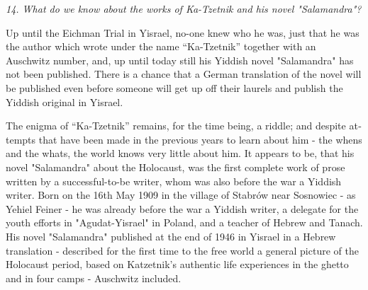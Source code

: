 \documentclass{article}
\begin{document}
\begin{pairs}
\begin{Rightside}
\begin{RTL}
\begin{hebrew}
\endnumbering
\end{hebrew}
\end{RTL}
\end{Rightside}


\begin{Leftside}
\begin{english}
\beginnumbering
\autopar
\emph{
14.
What do we know about the works of Ka-Tzetnik  and his novel "Salamandra"?
}
\newline 
 
 Up until the Eichman Trial in Yisrael, no-one knew who he was, just that he was the author which wrote under the name 
 ``Ka-Tzetnik''
together with an Auschwitz number, and, up until today still his Yiddish novel "Salamandra" has not been published.
There is a chance that a German translation of the novel will be published even before someone
will get up off their laurels and publish the Yiddish original in Yisrael.


 The enigma of ``Ka-Tzetnik'' remains, for the time being, a riddle; and despite attempts that have been made in 
 the previous years to learn about him - the whens and the whats,  
the world knows very little about him.
It appears to be, that his novel "Salamandra" about the Holocaust, was the first complete work of prose written by a successful-to-be writer, whom was also
before the war a Yiddish writer.
Born on the 16th May 1909 in the village of Stabrów near Sosnowiec - as Yehiel Feiner - he was already before the war a Yiddish writer, a delegate 
for the youth efforts in "Agudat-Yisrael" in Poland, and a teacher of Hebrew and Tanach. 
His novel "Salamandra" published at the end of 1946 in Yisrael in a Hebrew translation -
described for the first time to the free world a general picture of the Holocaust period,
based on Katzetnik's authentic life experiences in the ghetto and in four camps - Auschwitz included.


\end{english}
\end{Leftside}
\end{pairs}
\end{document}
